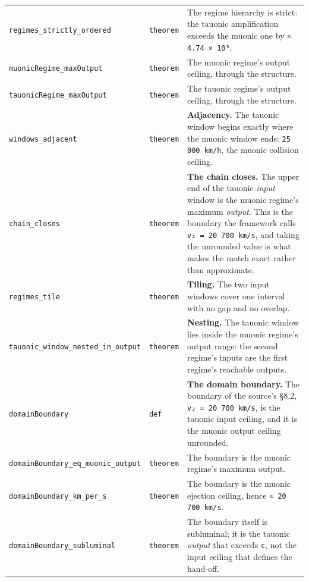 \documentclass[11pt,a4paper]{article}
\begin{document}
\begin{center}
\begin{longtable}{@{}p{}p{}p{}@{}}
\texttt{regimes\_\allowbreak{}strictly\_\allowbreak{}ordered} & \texttt{theorem} & \small The regime hierarchy is strict: the tauonic amplification exceeds the muonic one by \texttt{≈ 4.74 × 10³}. \\
\texttt{muonicRegime\_\allowbreak{}maxOutput} & \texttt{theorem} & \small The muonic regime's output ceiling, through the structure. \\
\texttt{tauonicRegime\_\allowbreak{}maxOutput} & \texttt{theorem} & \small The tauonic regime's output ceiling, through the structure. \\
\texttt{windows\_\allowbreak{}adjacent} & \texttt{theorem} & \small \textbf{Adjacency.}  The tauonic window begins exactly where the muonic window ends: \texttt{25 000 km/h}, the muonic collision ceiling. \\
\texttt{chain\_\allowbreak{}closes} & \texttt{theorem} & \small \textbf{The chain closes.}  The upper end of the tauonic \emph{input} window is the muonic regime's maximum \emph{output}.  This is the boundary the framework calls \texttt{v₂ = 20 700 km/s}, and taking the unrounded value is what makes the match exact rather than approximate. \\
\texttt{regimes\_\allowbreak{}tile} & \texttt{theorem} & \small \textbf{Tiling.}  The two input windows cover one interval with no gap and no overlap. \\
\texttt{tauonic\_\allowbreak{}window\_\allowbreak{}nested\_\allowbreak{}in\_\allowbreak{}output} & \texttt{theorem} & \small \textbf{Nesting.}  The tauonic window lies inside the muonic regime's output range: the second regime's inputs are the first regime's reachable outputs. \\
\texttt{domainBoundary} & \texttt{def} & \small \textbf{The domain boundary.}  The boundary of the source's §8.2, \texttt{v₂ = 20 700 km/s}, is the tauonic input ceiling, and it is the muonic output ceiling unrounded. \\
\texttt{domainBoundary\_\allowbreak{}eq\_\allowbreak{}muonic\_\allowbreak{}output} & \texttt{theorem} & \small The boundary is the muonic regime's maximum output. \\
\texttt{domainBoundary\_\allowbreak{}km\_\allowbreak{}per\_\allowbreak{}s} & \texttt{theorem} & \small The boundary is the muonic ejection ceiling, hence \texttt{≈ 20 700 km/s}. \\
\texttt{domainBoundary\_\allowbreak{}subluminal} & \texttt{theorem} & \small The boundary itself is subluminal; it is the tauonic \emph{output} that exceeds \texttt{c}, not the input ceiling that defines the hand-off. \\

\end{longtable}
\end{center}
\end{document}
